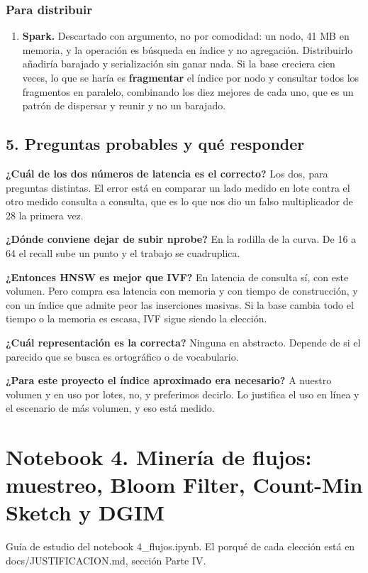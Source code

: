 \documentclass[11pt]{article}
\begin{document}
\subsubsection*{Para distribuir}
\begin{enumerate}
  \item \textbf{Spark.} Descartado con argumento, no por comodidad: un nodo, 41 MB en memoria, y la operación es búsqueda en índice y no agregación. Distribuirlo añadiría barajado y serialización sin ganar nada. Si la base creciera cien veces, lo que se haría es \textbf{fragmentar} el índice por nodo y consultar todos los fragmentos en paralelo, combinando los diez mejores de cada uno, que es un patrón de dispersar y reunir y no un barajado.
\end{enumerate}
\subsection*{5. Preguntas probables y qué responder}
\textbf{¿Cuál de los dos números de latencia es el correcto?} Los dos, para preguntas distintas. El error está en comparar un lado medido en lote contra el otro medido consulta a consulta, que es lo que nos dio un falso multiplicador de 28 la primera vez.

\textbf{¿Dónde conviene dejar de subir nprobe?} En la rodilla de la curva. De 16 a 64 el recall sube un punto y el trabajo se cuadruplica.

\textbf{¿Entonces HNSW es mejor que IVF?} En latencia de consulta sí, con este volumen. Pero compra esa latencia con memoria y con tiempo de construcción, y con un índice que admite peor las inserciones masivas. Si la base cambia todo el tiempo o la memoria es escasa, IVF sigue siendo la elección.

\textbf{¿Cuál representación es la correcta?} Ninguna en abstracto. Depende de si el parecido que se busca es ortográfico o de vocabulario.

\textbf{¿Para este proyecto el índice aproximado era necesario?} A nuestro volumen y en uso por lotes, no, y preferimos decirlo. Lo justifica el uso en línea y el escenario de más volumen, y eso está medido.


\clearpage
{}
\section*{Notebook 4. Minería de flujos: muestreo, Bloom Filter, Count-Min Sketch y DGIM}
Guía de estudio del notebook 4\_\allowbreak{}flujos.ipynb. El porqué de cada elección está en docs/JUSTIFICACION.md, sección Parte IV.
\end{document}

